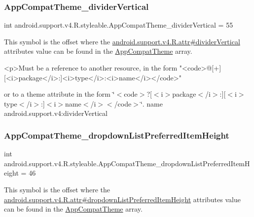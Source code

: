 \subsubsection{\texorpdfstring{App\+Compat\+Theme\+\_\+divider\+Vertical}{AppCompatTheme\_dividerVertical}}
{\footnotesize\ttfamily int android.\+support.\+v4.\+R.\+styleable.\+App\+Compat\+Theme\+\_\+divider\+Vertical = 55\hspace{0.3cm}{\ttfamily [static]}}

This symbol is the offset where the \hyperlink{classandroid_1_1support_1_1v4_1_1R_1_1attr_a94bef3415e2e39d667f0fecd21873aaa}{android.\+support.\+v4.\+R.\+attr\#divider\+Vertical} attribute\textquotesingle{}s value can be found in the \hyperlink{classandroid_1_1support_1_1v4_1_1R_1_1styleable_ac07ebbe62ed977f6dcaadc6397840ace}{App\+Compat\+Theme} array.

\begin{DoxyVerb}      <p>Must be a reference to another resource, in the form "<code>@[+][<i>package</i>:]<i>type</i>:<i>name</i></code>"
\end{DoxyVerb}
 or to a theme attribute in the form \char`\"{}$<$code$>$?\mbox{[}$<$i$>$package$<$/i$>$\+:\mbox{]}\mbox{[}$<$i$>$type$<$/i$>$\+:\mbox{]}$<$i$>$name$<$/i$>$$<$/code$>$\char`\"{}.  name android.\+support.\+v4\+:divider\+Vertical \mbox{\label{classandroid_1_1support_1_1v4_1_1R_1_1styleable_aff7f53164ea3cbce6587faad4b37b944}} 
\subsubsection{\texorpdfstring{App\+Compat\+Theme\+\_\+dropdown\+List\+Preferred\+Item\+Height}{AppCompatTheme\_dropdownListPreferredItemHeight}}
{\footnotesize\ttfamily int android.\+support.\+v4.\+R.\+styleable.\+App\+Compat\+Theme\+\_\+dropdown\+List\+Preferred\+Item\+Height = 46\hspace{0.3cm}{\ttfamily [static]}}

This symbol is the offset where the \hyperlink{classandroid_1_1support_1_1v4_1_1R_1_1attr_af2e9cb4e052fc2c281ed319a8757c615}{android.\+support.\+v4.\+R.\+attr\#dropdown\+List\+Preferred\+Item\+Height} attribute\textquotesingle{}s value can be found in the \hyperlink{classandroid_1_1support_1_1v4_1_1R_1_1styleable_ac07ebbe62ed977f6dcaadc6397840ace}{App\+Compat\+Theme} array.

